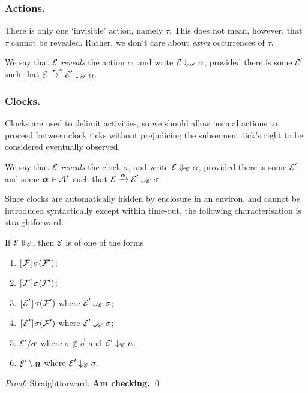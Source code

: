 \documentclass[orivec,envcountsame]{llncs}
\newcommand{\Exhibits}[1]{\mathrel{\downarrow_{#1}}}
\newcommand{\ExhibitsA}{\Exhibits{\mathscr{A}}}
\newcommand{\ExhibitsC}{\Exhibits{\mathscr{C}}}
\newcommand{\Reveals}[1]{\mathrel{\Downarrow_{#1}}}
\newcommand{\RevealsA}{\Reveals{\mathscr{A}}}
\newcommand{\RevealsC}{\Reveals{\mathscr{C}}}
\newcommand{\Does}[1]{\xderives{#1}}
\newcommand{\DoesMany}[1]{\mathrel{{\xderives{#1}}^*}}
\begin{document}
\subsubsection{Actions.}

There is only one `invisible' action, namely $\tau$. This does not mean, however, that $\tau$ cannot be revealed. Rather, we don't care about \emph{extra} occurrences of $\tau$.

\begin{definition}
We say that $\text{$\mathcal{E}$}$ \emph{reveals} the action $\alpha$, and write $\expr \RevealsA \alpha$, provided there is some $\text{$\mathcal{E}$}'$ such that $\expr \DoesMany{\tau} \expr' \ExhibitsA \alpha$.
\end{definition}

\subsubsection{Clocks.}

Clocks are used to delimit activities, so we should allow normal actions to proceed between clock ticks without prejudicing the subsequent tick's right to be considered eventually observed.

\begin{definition}
We say that $\text{$\mathcal{E}$}$ \emph{reveals} the clock $\sigma$, and write $\expr \RevealsC \alpha$, provided there is some $\text{$\mathcal{E}$}'$ and some $\vec{\alpha} \in \act^*$ such that $\expr \Does{\vec{\alpha}} \expr' \ExhibitsC \sigma$.
\end{definition}

Since clocks are automatically hidden by enclosure in an environ, and cannot be introduced syntactically except within time-out, the following characterisation is straightforward.

\begin{proposition}
If $\expr \RevealsC$, then $\text{$\mathcal{E}$}$ is of one of the forms
\begin{enumerate}
\item
    $\lfloor{\text{$\mathcal{F}$}}\rfloor {\sigma} ({\text{$\mathcal{F}$}'})$;
\item
    $\lceil{\text{$\mathcal{F}$}}\rceil {\sigma} ({\text{$\mathcal{F}$}'})$;
\item
    $\lfloor{\text{$\mathcal{E}$}'}\rfloor {\sigma} ({\text{$\mathcal{F}$}'})$ where $\expr' \ExhibitsC \sigma$;
\item
    $\lceil{\text{$\mathcal{E}$}'}\rceil {\sigma} ({\text{$\mathcal{F}$}'})$ where $\expr' \ExhibitsC \sigma$;
\item
    $\expr' \hide{\vec{\sigma}}$ where $\sigma \not\in \vec{\sigma}$ and $\expr' \ExhibitsC n$.
\item
    $\expr' \res{ \vec{n} }$ where $\expr' \ExhibitsC \sigma$.
\end{enumerate}
\end{proposition}
\begin{proof}
Straightforward. \textbf{Am checking.}
\qed \end{proof}
\end{document}
